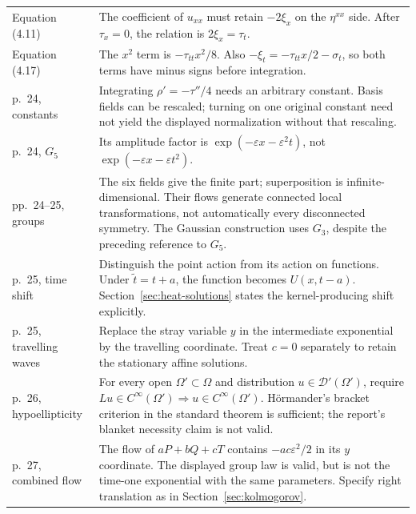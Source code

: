 \documentclass[11pt,a4paper]{article}
\numberwithin{equation}{section}
\theoremstyle{definition}
\theoremstyle{plain}
\theoremstyle{remark}
\begin{document}
\begin{longtable}{@{}>{\raggedright\arraybackslash}p{.21\linewidth}>{\raggedright\arraybackslash}p{.73\linewidth}@{}}
Equation (4.11) & The coefficient of $u_{xx}$ must retain $-2\xi_x$ on the $\eta^{xx}$ side. After $\tau_x=0$, the relation is $2\xi_x=\tau_t$.\\
Equation (4.17) & The $x^2$ term is $-\tau_{tt}x^2/8$. Also $-\xi_t=-\tau_{tt}x/2-\sigma_t$, so both terms have minus signs before integration.\\
p.~24, constants & Integrating $\rho'=-\tau''/4$ needs an arbitrary constant. Basis fields can be rescaled; turning on one original constant need not yield the displayed normalization without that rescaling.\\
p.~24, $G_5$ & Its amplitude factor is $\exp(-\varepsilon x-\varepsilon^2t)$, not $\exp(-\varepsilon x-\varepsilon t^2)$.\\
pp.~24--25, groups & The six fields give the finite part; superposition is infinite-dimensional. Their flows generate connected local transformations, not automatically every disconnected symmetry. The Gaussian construction uses $G_3$, despite the preceding reference to $G_5$.\\
p.~25, time shift & Distinguish the point action from its action on functions. Under $\widetilde t=t+a$, the function becomes $U(x,t-a)$. Section~\ref{sec:heat-solutions} states the kernel-producing shift explicitly.\\
p.~25, travelling waves & Replace the stray variable $y$ in the intermediate exponential by the travelling coordinate. Treat $c=0$ separately to retain the stationary affine solutions.\\
p.~26, hypoellipticity & For every open $\Omega'\subset\Omega$ and distribution $u\in\mathcal D'(\Omega')$, require $Lu\in C^\infty(\Omega')\Rightarrow u\in C^\infty(\Omega')$. H\"ormander's bracket criterion in the standard theorem is sufficient; the report's blanket necessity claim is not valid.\\
p.~27, combined flow & The flow of $aP+bQ+cT$ contains $-ac\varepsilon^2/2$ in its $y$ coordinate. The displayed group law is valid, but is not the time-one exponential with the same parameters. Specify right translation as in Section~\ref{sec:kolmogorov}.\\
\bottomrule
\end{longtable}
\normalsize

\clearpage
\end{document}
